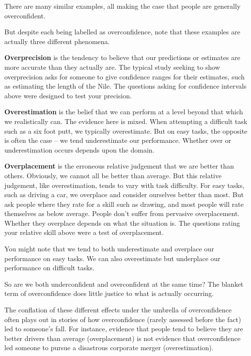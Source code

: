 \documentclass[
  letterpaper,
  DIV=11,
  numbers=noendperiod]{scrreprt}
\begin{document}
There are many similar examples, all making the case that people are
generally overconfident.

But despite each being labelled as overconfidence, note that these
examples are actually three different phenomena.

\textbf{Overprecision} is the tendency to believe that our predictions
or estimates are more accurate than they actually are. The typical study
seeking to show overprecision asks for someone to give confidence ranges
for their estimates, such as estimating the length of the Nile. The
questions asking for confidence intervals above were designed to test
your precision.

\textbf{Overestimation} is the belief that we can perform at a level
beyond that which we realistically can. The evidence here is mixed. When
attempting a difficult task such as a six foot putt, we typically
overestimate. But on easy tasks, the opposite is often the case -- we
tend underestimate our performance. Whether over or underestimation
occurs depends upon the domain.

\textbf{Overplacement} is the erroneous relative judgement that we are
better than others. Obviously, we cannot all be better than average. But
this relative judgement, like overestimation, tends to vary with task
difficulty. For easy tasks, such as driving a car, we overplace and
consider ourselves better than most. But ask people where they rate for
a skill such as drawing, and most people will rate themselves as below
average. People don't suffer from pervasive overplacement. Whether they
overplace depends on what the situation is. The questions rating your
relative skill above were a test of overplacement.

You might note that we tend to both underestimate and overplace our
performance on easy tasks. We can also overestimate but underplace our
performance on difficult tasks.

So are we both underconfident and overconfident at the same time? The
blanket term of overconfidence does little justice to what is actually
occurring.

The conflation of these different effects under the umbrella of
overconfidence often plays out in stories of how overconfidence (rarely
assessed before the fact) led to someone's fall. For instance, evidence
that people tend to believe they are better drivers than average
(overplacement) is not evidence that overconfidence led someone to
pursue a disastrous corporate merger (overestimation).
\end{document}
